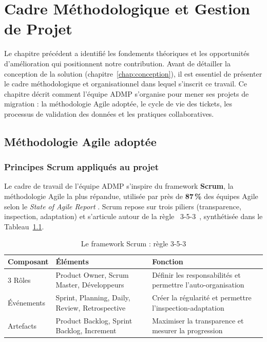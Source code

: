 \chapter{Cadre Méthodologique et Gestion de Projet}
\label{chap:methodologie}

Le chapitre précédent a identifié les fondements théoriques et les opportunités d'amélioration qui positionnent notre contribution. Avant de détailler la conception de la solution (chapitre~\ref{chap:conception}), il est essentiel de présenter le cadre méthodologique et organisationnel dans lequel s'inscrit ce travail. Ce chapitre décrit comment l'équipe ADMP s'organise pour mener ses projets de migration : la méthodologie Agile adoptée, le cycle de vie des tickets, les processus de validation des données et les pratiques collaboratives.

\section{Méthodologie Agile adoptée}
\label{sec:methodologie-agile}

\subsection{Principes Scrum appliqués au projet}
\label{subsec:scrum}

Le cadre de travail de l'équipe ADMP s'inspire du framework \textbf{Scrum}, la méthodologie Agile la plus répandue, utilisée par près de \textbf{87\,\%} des équipes Agile selon le \textit{State of Agile Report} \cite{digitalai2024}. Scrum repose sur trois piliers (transparence, inspection, adaptation) et s'articule autour de la règle \og~3-5-3~\fg{}, synthétisée dans le Tableau~\ref{tab:scrum-335}.

\begin{table}[H]
\centering
\caption{Le framework Scrum : règle 3-5-3}
\label{tab:scrum-335}
\begin{tabularx}{\textwidth}{lXX}
\toprule
\textbf{Composant} & \textbf{Éléments} & \textbf{Fonction} \\
\midrule
3 Rôles & Product Owner, Scrum Master, Développeurs & Définir les responsabilités et permettre l'auto-organisation \\
\addlinespace
5 Événements & Sprint, Planning, Daily, Review, Retrospective & Créer la régularité et permettre l'inspection-adaptation \\
\addlinespace
3 Artefacts & Product Backlog, Sprint Backlog, Increment & Maximiser la transparence et mesurer la progression \\
\bottomrule
\end{tabularx}
\end{table}

